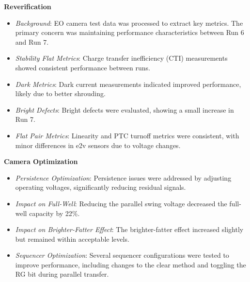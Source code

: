 \textbf{Reverification} \\
\begin{itemize}
    \item \textit{Background}: EO camera test data was processed to extract key metrics. The primary concern was maintaining performance characteristics between Run 6 and Run 7.
    \item \textit{Stability Flat Metrics}: Charge transfer inefficiency (CTI) measurements showed consistent performance between runs.
    \item \textit{Dark Metrics}: Dark current measurements indicated improved performance, likely due to better shrouding.
    \item \textit{Bright Defects}: Bright defects were evaluated, showing a small increase in Run 7.
    \item \textit{Flat Pair Metrics}: Linearity and PTC turnoff metrics were consistent, with minor differences in e2v sensors due to voltage changes.
\end{itemize}

\textbf{Camera Optimization} \\
\begin{itemize}
    \item \textit{Persistence Optimization}: Persistence issues were addressed by adjusting operating voltages, significantly reducing residual signals.
    \item \textit{Impact on Full-Well}: Reducing the parallel swing voltage decreased the full-well capacity by 22\%.
    \item \textit{Impact on Brighter-Fatter Effect}: The brighter-fatter effect increased slightly but remained within acceptable levels.
    \item \textit{Sequencer Optimization}: Several sequencer configurations were tested to improve performance, including changes to the clear method and toggling the RG bit during parallel transfer.
\end{itemize}

